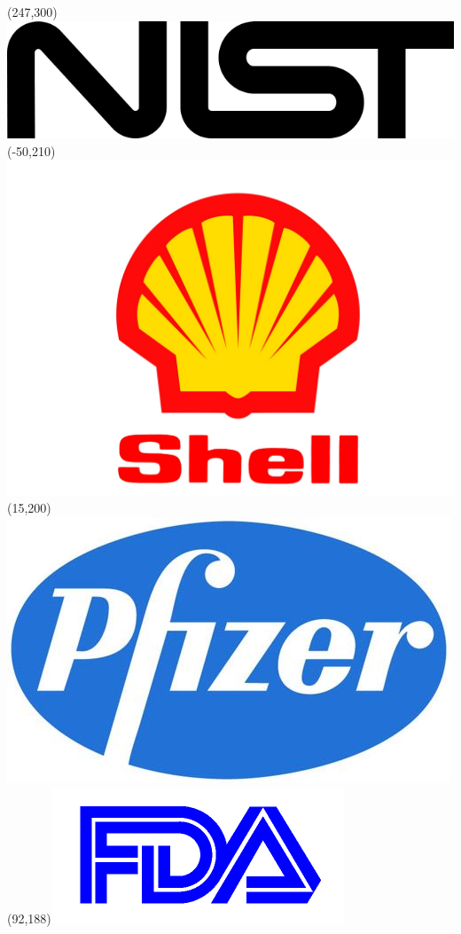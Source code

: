 \begin{frame}
\Put(247,300){\includegraphics[scale=.1]{../common/pics/R_using_logos/nist}}
\Put(-50,210){\includegraphics[scale=.05]{../common/pics/R_using_logos/shell}}
\Put(15,200){\includegraphics[scale=.17]{../common/pics/R_using_logos/pfizer}}
\Put(92,188){\includegraphics[scale=.22]{../common/pics/R_using_logos/fda}}

\end{frame}
